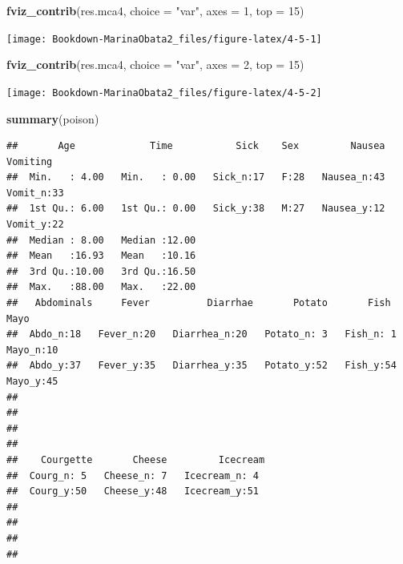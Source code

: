 \documentclass[]{book}
\newenvironment{Shaded}{\begin{snugshade}}{\end{snugshade}}
\newcommand{\DataTypeTok}[1]{\textcolor[rgb]{0.13,0.29,0.53}{#1}}
\newcommand{\DecValTok}[1]{\textcolor[rgb]{0.00,0.00,0.81}{#1}}
\newcommand{\KeywordTok}[1]{\textcolor[rgb]{0.13,0.29,0.53}{\textbf{#1}}}
\newcommand{\NormalTok}[1]{#1}
\newcommand{\StringTok}[1]{\textcolor[rgb]{0.31,0.60,0.02}{#1}}
\begin{document}
\begin{Shaded}
\begin{Highlighting}[]
\KeywordTok{fviz_contrib}\NormalTok{(res.mca4, }\DataTypeTok{choice =} \StringTok{"var"}\NormalTok{, }\DataTypeTok{axes =} \DecValTok{1}\NormalTok{, }\DataTypeTok{top =} \DecValTok{15}\NormalTok{)}
\end{Highlighting}
\end{Shaded}

\texttt{[image: Bookdown-MarinaObata2\_files/figure-latex/4-5-1]}

\begin{Shaded}
\begin{Highlighting}[]
\KeywordTok{fviz_contrib}\NormalTok{(res.mca4, }\DataTypeTok{choice =} \StringTok{"var"}\NormalTok{, }\DataTypeTok{axes =} \DecValTok{2}\NormalTok{, }\DataTypeTok{top =} \DecValTok{15}\NormalTok{)}
\end{Highlighting}
\end{Shaded}

\texttt{[image: Bookdown-MarinaObata2\_files/figure-latex/4-5-2]}

\begin{Shaded}
\begin{Highlighting}[]
\KeywordTok{summary}\NormalTok{(poison)}
\end{Highlighting}
\end{Shaded}

\begin{verbatim}
##       Age             Time           Sick    Sex         Nausea      Vomiting 
##  Min.   : 4.00   Min.   : 0.00   Sick_n:17   F:28   Nausea_n:43   Vomit_n:33  
##  1st Qu.: 6.00   1st Qu.: 0.00   Sick_y:38   M:27   Nausea_y:12   Vomit_y:22  
##  Median : 8.00   Median :12.00                                                
##  Mean   :16.93   Mean   :10.16                                                
##  3rd Qu.:10.00   3rd Qu.:16.50                                                
##  Max.   :88.00   Max.   :22.00                                                
##   Abdominals     Fever          Diarrhae       Potato       Fish        Mayo   
##  Abdo_n:18   Fever_n:20   Diarrhea_n:20   Potato_n: 3   Fish_n: 1   Mayo_n:10  
##  Abdo_y:37   Fever_y:35   Diarrhea_y:35   Potato_y:52   Fish_y:54   Mayo_y:45  
##                                                                                
##                                                                                
##                                                                                
##                                                                                
##    Courgette       Cheese         Icecream 
##  Courg_n: 5   Cheese_n: 7   Icecream_n: 4  
##  Courg_y:50   Cheese_y:48   Icecream_y:51  
##                                            
##                                            
##                                            
## 
\end{verbatim}
\end{document}
